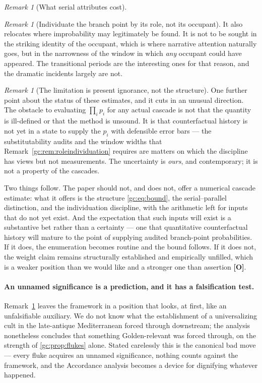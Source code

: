 \documentclass[11pt]{article}
\numberwithin{equation}{section}
\theoremstyle{plain}
\theoremstyle{definition}
\theoremstyle{remark}
\newtheorem{remark}[theorem]{Remark}
\begin{document}
\begin{remark}[What serial attributes cost]
\begin{remark}[Individuate the branch point by its role, not its
occupant]
It also relocates where improbability may legitimately be found. It is
not to be sought in the striking identity of the occupant, which is
where narrative attention naturally goes, but in the narrowness of the
window in which \emph{any} occupant could have appeared. The
transitional periods are the interesting ones for that reason, and the
dramatic incidents largely are not.
\end{remark}

\begin{remark}[The limitation is present ignorance, not the structure]
\label{gc:rem:measurement}
One further point about the status of these estimates, and it
cuts in an unusual direction. The obstacle to evaluating $\prod_i p_i$ for any actual cascade is not
that the quantity is ill-defined or that the method is unsound. It is
that counterfactual history is not yet in a state to supply the
$p_i$ with defensible error bars --- the substitutability audits and the
window widths that Remark~\ref{gc:rem:roleindividuation} requires are
matters on which the discipline has views but not measurements. The
uncertainty is \emph{ours}, and contemporary; it is not a property of
the cascades.

Two things follow. The paper should not, and does not, offer a numerical
cascade estimate: what it offers is the structure
\eqref{gc:eq:bound}, the serial--parallel distinction, and the
individuation discipline, with the arithmetic left for inputs that do
not yet exist. And the expectation that such inputs will exist is a
substantive bet rather than a certainty --- one that quantitative
counterfactual history will mature to the point of supplying audited
branch-point probabilities. If it does, the enumeration becomes
routine and the bound follows. If it does not, the weight claim remains
structurally established and empirically unfilled, which is a weaker
position than we would like and a stronger one than assertion
\textbf{[O]}.
\end{remark}

\paragraph{An unnamed significance is a prediction, and it has a
falsification test.}\label{gc:rem:unnamed}
Remark~\ref{gc:rem:measurement} leaves the framework in a position that
looks, at first, like an unfalsifiable auxiliary. We do not know what
the establishment of a universalizing cult in the late-antique
Mediterranean forced through downstream; the analysis nonetheless
concludes that something Golden-relevant was forced through, on the
strength of \ref{gc:prop:flukes} alone. Stated carelessly this is the
canonical bad move --- every fluke acquires an unnamed significance,
nothing counts against the framework, and the Accordance analysis
becomes a device for dignifying whatever happened.


\end{remark}
\end{document}
